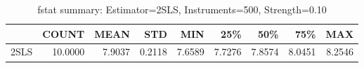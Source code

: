 \begin{table}[ht]
\centering
\caption{fstat summary: Estimator=2SLS, Instruments=500, Strength=0.10}
\begin{tabular}{lrrrrrrrr}
\toprule
 & COUNT & MEAN & STD & MIN & 25\% & 50\% & 75\% & MAX \\
\midrule
2SLS & 10.0000 & 7.9037 & 0.2118 & 7.6589 & 7.7276 & 7.8574 & 8.0451 & 8.2546 \\
\bottomrule
\end{tabular}
\end{table}
